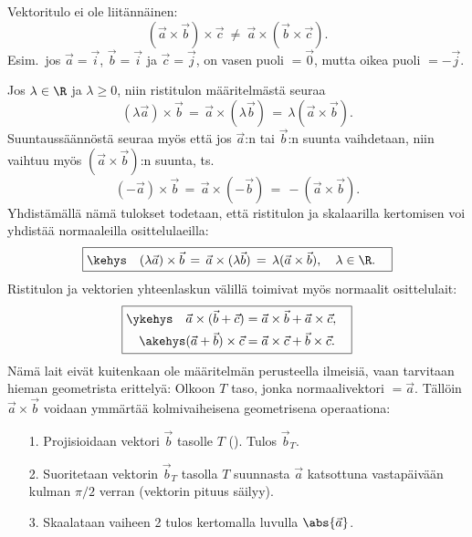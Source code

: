 Vektoritulo ei ole liitännäinen:
\[
(\vec a \times \vec b) \times \vec c\ \neq\ \vec a \times (\vec b \times \vec c).
\]
Esim.\ jos $\vec a=\vec i$, $\vec b=\vec i$ ja $\vec c=\vec j$, on vasen puoli $=\vec 0$,
mutta oikea puoli $=-\vec j$.

Jos $\lambda \in \R$ ja $\lambda \geq 0$, niin ristitulon määritelmästä seuraa
\[
(\lambda\vec a) \times \vec b \,=\, \vec a \times (\lambda\vec b) 
                              \,=\, \lambda(\vec a \times \vec b).
\] 
Suuntaussäännöstä seuraa myös että jos $\vec a$:n tai $\vec b$:n suunta vaihdetaan, niin vaihtuu
myös $(\vec a \times \vec b)$:n suunta, ts.
\[
(-\vec a) \times \vec b \,=\, \vec a \times (-\vec b) \,=\, - (\vec a \times \vec b).
\]
Yhdistämällä nämä tulokset todetaan, että ristitulon ja skalaarilla kertomisen voi yhdistää 
normaaleilla osittelulaeilla:
\begin{equation} \label{cross2}
\boxed{\kehys\quad (\lambda \vec a) \times \vec b \,=\, \vec a \times (\lambda \vec b) 
                     \,=\, \lambda (\vec a \times \vec b), \quad \lambda \in \R. \quad}
\end{equation}
Ristitulon ja vektorien yhteenlaskun välillä toimivat myös normaalit osittelulait:
\begin{equation} \label{cross3} \boxed{ \begin{aligned}
\ykehys\quad \vec a \times (\vec b + \vec c) 
                           &= \vec a \times \vec b + \vec a \times \vec c, \\
\akehys (\vec a + \vec b) \times \vec c      
                           &= \vec a \times \vec c + \vec b \times \vec c. \quad
\end{aligned} } \end{equation}
Nämä lait eivät kuitenkaan ole määritelmän perusteella ilmeisiä, vaan tarvitaan hieman 
geometrista erittelyä: Olkoon $T$ taso, jonka normaalivektori $=\vec a$. Tällöin 
$\vec a \times \vec b$ voidaan ymmärtää kolmivaiheisena geometrisena operaationa:
\begin{itemize}
\item[1.] Projisioidaan vektori $\vec b$ tasolle $T$ ().
          Tulos $\vec b_T$. 
\item[2.] Suoritetaan vektorin $\vec b_T$  tasolla $T$ suunnasta $\vec a$ katsottuna
          vastapäivään kulman $\pi/2$ verran (vektorin pituus säilyy).
\item[3.] Skaalataan vaiheen 2 tulos kertomalla luvulla $\abs{\vec a}$.
\end{itemize}
